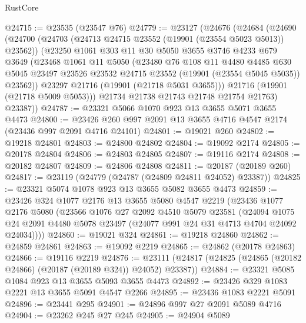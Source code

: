 \begin{lexlean}{RustCore}
\begin{coremodule}
@24715 := @23535 (@23547 @76)
@24779 := @23127
    (@24676
      (@24684
        (@24690
          (@24700
            (@24703 (@24713 @24715 @23552 (@19901 (@23554 @5023 @5013)) @23562))
            (@23250
              @1061
              @303
              @11
              @30
              @5050
              @3655
              @3746
              @4233
              @679
              @3649
              (@23468
                @1061
                @11
                @5050
                (@23480
                  @76
                  @108
                  @11
                  @4480
                  @4485
                  @630
                  @5045
                  @23497
                  @23526
                  @23532
                  @24715
                  @23552
                  (@19901 (@23554 @5045 @5035))
                  @23562))
              @23297
              @21716
              (@19901 (@21718 @5031 @3655)))
            @21716
            (@19901 (@21718 @5009 @5053)))
          @21734
          @21738
          @21743
          @21748
          @21754
          @21763)
        @23387))
@24787 := @23321 @5066 @1070 @923 @13 @3655 @5071 @3655 @4473
@24800 := @23426 @260 @997 @2091 @13 @3655 @4716 @4547 @2174 (@23436 @997 @2091 @4716 @24101)
@24801 := @19021 @260
@24802 := @19218 @24801
@24803 := @24800 @24802
@24804 := @19092 @2174
@24805 := @20178 @24804
@24806 := @24803 @24805
@24807 := @19116 @2174
@24808 := @20182 @24807
@24809 := @24806 @24808
@24811 := @20187 (@20189 @260)
@24817 := @23119 (@24779 (@24787 (@24809 @24811 @24052) @23387))
@24825 := @23321 @5074 @1078 @923 @13 @3655 @5082 @3655 @4473
@24859 := @23426
    @324
    @1077
    @2176
    @13
    @3655
    @5080
    @4547
    @2219
    (@23436
      @1077
      @2176
      @5080
      (@23566
        @1076
        @27
        @2092
        @4510
        @5079
        @23581
        (@24094
          @1075
          @24
          @2091
          @4480
          @5078
          @23497
          (@24077 @991 @24 @31 @4713 @4704 @24092 @24034))))
@24860 := @19021 @324
@24861 := @19218 @24860
@24862 := @24859 @24861
@24863 := @19092 @2219
@24865 := @24862 (@20178 @24863)
@24866 := @19116 @2219
@24876 := @23111 (@24817 (@24825 (@24865 (@20182 @24866) (@20187 (@20189 @324)) @24052) @23387))
@24884 := @23321 @5085 @1084 @923 @13 @3655 @5093 @3655 @4473
@24892 := @23426 @329 @1083 @2221 @13 @3655 @5091 @4547 @2266
@24895 := @23436 @1083 @2221 @5091
@24896 := @23441 @295
@24901 := @24896 @997 @27 @2091 @5089 @4716
@24904 := @23262 @245 @27 @245
@24905 := @24904 @5089

\end{coremodule}
\end{lexlean}
